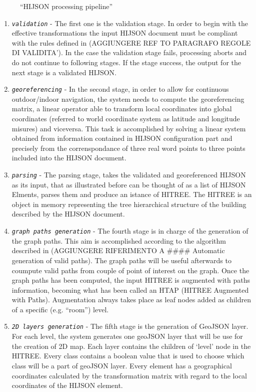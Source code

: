 \documentclass{sig-alternate}
\begin{document}
\begin{figure}
\centering
{}
\caption{``HIJSON processing pipeline''}
\label{fig:pipeline}
\end{figure}

\begin{enumerate}
\item
  \textit{\texttt{validation}} - The first one is the validation stage. In order to begin with the effective transformations the input HIJSON document must be compliant with the rules defined in (AGGIUNGERE REF TO PARAGRAFO REGOLE DI VALIDITA'). In the case the validation stage fails, processing aborts and do not continue to following stages. If the stage success, the output for the next stage is a validated HIJSON.
\item
  \textit{\texttt{georeferencing}} - In the second stage, in order to allow for continuous outdoor/indoor navigation, the system needs to compute the georeferencing matrix, a linear operator able to transform local coordinates into global coordinates (referred to world coordinate system as latitude and longitude misures) and viceversa. This task is accomplished by solving a linear system obtained from information contained in HIJSON configuration part and precisely from the correnspondance of three real word points to three points included into the HIJSON document.
\item
  \textit{\texttt{parsing}} - The parsing stage, takes the validated and georeferenced HIJSON as its input, that as illustrated before can be thought of as a list of HIJSON Elments, parses them and produce an istance of HITREE. The HITREE is an object in memory representing the tree hierarchical structure of the building described by the HIJSON document.
\item
  \textit{\texttt{graph paths generation}} - The fourth stage is in charge of the generation of the graph paths. This aim is accomplished according to the algorithm described in (AGGIUNGERE RIFERIMENTO A \#\#\#\# Automatic generation of valid paths). The graph paths will be useful afterwards to coumpute valid paths from couple of point of interest on the graph. Once the graph paths has been computed, the input HITREE is augmented with paths information, becoming what has been called an HTAP (HITREE Augmented with Paths). Augmentation always takes place as leaf nodes added as children of a specific (e.g. ``room'') level.
\item
  \textit{\texttt{2D layers generation}} - The fifth stage is the generation of GeoJSON layer. For each level, the system generates one geoJSON layer that will be use for the creation of 2D map. Each layer contains the children of `level' node in the HITREE. Every class contains a boolean value that is used to choose which class will be a part of geoJSON layer. Every element has a geographical coordinates calculated by the transformation matrix with regard to the local coordinates of the HIJSON element.

\end{enumerate}
\end{document}

